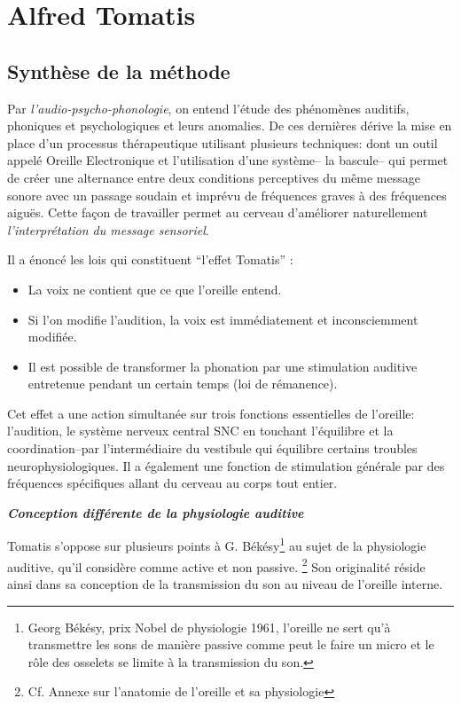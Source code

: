 


\chapter{Alfred Tomatis}


\section{Synthèse de la méthode}

Par {\textit{l'audio-psycho-phonologie}}, on entend l'étude des
phénomènes auditifs, phoniques et psychologiques et leurs anomalies.
De ces dernières dérive la mise en place d'un processus thérapeutique
utilisant plusieurs techniques:  dont un
 outil  appelé
\label{outil_oreille_electro}
Oreille Electronique
et l'utilisation d'une système-- la 
bascule-- qui permet de créer une alternance entre deux conditions perceptives 
du même message sonore avec un passage soudain et imprévu de fréquences graves à des 
fréquences aiguës. Cette façon de travailler permet au
cerveau d'améliorer naturellement \emph{l'interprétation du message
sensoriel}.


Il a énoncé les lois qui constituent ``l'effet Tomatis'' : 
\begin{itemize}
	\item La voix ne contient que ce que l'oreille entend.
	\item Si l'on modifie l'audition, la voix est immédiatement et 
inconsciemment
		modifiée.
	\item Il est possible de transformer la phonation par une stimulation 
auditive
		entretenue pendant un certain temps (loi de rémanence).
\end{itemize}

Cet effet a une action simultanée sur trois fonctions essentielles de
l'oreille: l'audition, le système nerveux central SNC en touchant l'équilibre et la coordination--par 
l'intermédiaire
		du vestibule qui équilibre certains troubles
                neurophysiologiques.
                Il a également une fonction de stimulation générale
               par des fréquences spécifiques allant du cerveau au corps tout entier.






\emph{\textbf{  Conception différente de la physiologie auditive}}

Tomatis  s'oppose sur plusieurs points à G. Békésy\footnote{Georg Békésy, prix 
Nobel de physiologie 1961, l'oreille ne sert qu'à transmettre les sons de manière passive
comme peut le faire un micro et le rôle des osselets 
se limite à la transmission du
son.} au sujet de la
physiologie auditive, qu'il considère comme active et non passive. \footnote{Cf. Annexe sur l'anatomie de l'oreille et sa physiologie}
Son originalité réside ainsi dans sa conception de la transmission du son
au niveau de l'oreille interne. 



